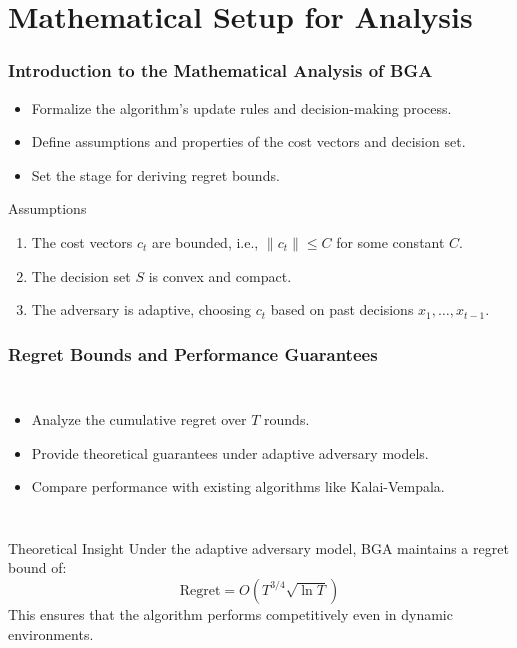 \documentclass{beamer}
\begin{document}
\section{Mathematical Setup for Analysis}

\begin{frame}
\frametitle{Introduction to the Mathematical Analysis of BGA}
\begin{itemize}
    \item Formalize the algorithm's update rules and decision-making process.
    \item Define assumptions and properties of the cost vectors and decision set.
    \item Set the stage for deriving regret bounds.
\end{itemize}
\begin{exampleblock}{Assumptions}
    \begin{enumerate}
        \item The cost vectors \( c_t \) are bounded, i.e., \( \|c_t\| \leq C \) for some constant \( C \).
        \item The decision set \( S \) is convex and compact.
        \item The adversary is adaptive, choosing \( c_t \) based on past decisions \( x_1, \dots, x_{t-1} \).
    \end{enumerate}
\end{exampleblock}
\end{frame}

\begin{frame}
\frametitle{Regret Bounds and Performance Guarantees}
\begin{columns}
    \begin{itemize}
        \item Analyze the cumulative regret over \( T \) rounds.
        \item Provide theoretical guarantees under adaptive adversary models.
        \item Compare performance with existing algorithms like Kalai-Vempala.
    \end{itemize}
\end{columns}
\begin{block}{Theoretical Insight}
    Under the adaptive adversary model, BGA maintains a regret bound of:
    \[
    \text{Regret} = O\left(T^{3/4} \sqrt{\ln T}\right)
    \]
    This ensures that the algorithm performs competitively even in dynamic environments.
\end{block}
\end{frame}
\end{document}
